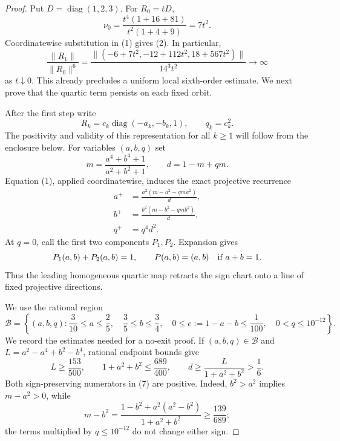 \documentclass[11pt]{article}
\newcommand{\norm}[1]{\lVert #1\rVert}
\DeclareMathOperator{\diag}{diag}
\begin{document}
\begin{proof}
Put $D=\diag(1,2,3)$.  For $R_0=tD$,
\[
 \nu_0=\frac{t^4(1+16+81)}{t^2(1+4+9)}=7t^2.
\]
Coordinatewise substitution in (1) gives (2).  In particular,
\begin{equation}
 \frac{\norm{R_1}}{\norm{R_0}^{6}}
 =\frac{\norm{(-6+7t^2,-12+112t^2,18+567t^2)}}
        {14^3t^2}\longrightarrow\infty
\end{equation}
as $t\downarrow0$.  This already precludes a uniform local sixth-order
estimate.  We next prove that the quartic term persists on each fixed orbit.

After the first step write
\begin{equation}
 R_k=c_k\diag(-a_k,-b_k,1),\qquad q_k=c_k^2.
\end{equation}
The positivity and validity of this representation for all $k\geq1$ will
follow from the enclosure below.  For variables $(a,b,q)$ set
\[
 m=\frac{a^4+b^4+1}{a^2+b^2+1},\qquad d=1-m+qm.
\]
Equation (1), applied coordinatewise, induces the exact projective recurrence
\begin{equation}
 \begin{split}
 a^+&=\frac{a^2(m-a^2-qma^2)}d,\\
 b^+&=\frac{b^2(m-b^2-qmb^2)}d,\\
 q^+&=q^4d^2.
 \end{split}
\end{equation}
At $q=0$, call the first two components $P_1,P_2$.  Expansion gives
\begin{equation}
 P_1(a,b)+P_2(a,b)=1,\qquad
 P(a,b)=(a,b)\quad\hbox{if }a+b=1.
\end{equation}
Thus the leading homogeneous quartic map retracts the sign chart onto a line
of fixed projective directions.

We use the rational region
\begin{equation}
 \mathcal B=\left\{(a,b,q):
 \frac3{10}\leq a\leq\frac25,\quad
 \frac35\leq b\leq\frac34,\quad
 0\leq e:=1-a-b\leq\frac1{100},\quad
 0<q\leq10^{-12}\right\}.
\end{equation}
We record the estimates needed for a no-exit proof.  If $(a,b,q)\in\mathcal
B$ and $L=a^2-a^4+b^2-b^4$, rational endpoint bounds give
\begin{equation}
 L\geq\frac{153}{500},\qquad
 1+a^2+b^2\leq\frac{689}{400},\qquad
 d\geq\frac{L}{1+a^2+b^2}>\frac16.
\end{equation}
Both sign-preserving numerators in (7) are positive.  Indeed, $b^2>a^2$
implies $m-a^2>0$, while
\[
 m-b^2=\frac{1-b^2+a^2(a^2-b^2)}{1+a^2+b^2}
 \geq\frac{139}{689};
\]
the terms multiplied by $q\leq10^{-12}$ do not change either sign.


\end{proof}
\end{document}
